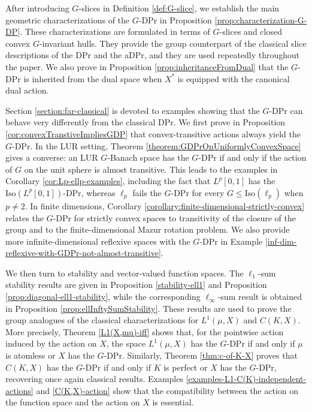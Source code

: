 \documentclass[a4paper,12pt]{amsart}
\theoremstyle{definition}
\theoremstyle{definition}
\theoremstyle{remark}
\numberwithin{equation}{section}
\newcommand{\Iso}{\mathrm{Iso}}
\renewcommand{\leq}{\leqslant}
\newcommand{\<}{\langle}
\renewcommand{\>}{\rangle}
\begin{document}
	After introducing $G$-slices in Definition \ref{def:G-slice}, we establish the main geometric characterizations of the $G$-DPr in Proposition \ref{prop:characterization-G-DP}. These characterizations are formulated in terms of $G$-slices and closed convex $G$-invariant hulls. They provide the group counterpart of the classical slice descriptions of the DPr and the aDPr, and they are used repeatedly throughout the paper. We also prove in Proposition \ref{prop:inheritanceFromDual} that the $G$-DPr is inherited from the dual space when $X^*$ is equipped with the canonical dual action.
	
	Section \ref{section:far-classical} is devoted to examples showing that the $G$-DPr can behave very differently from the classical DPr. We first prove in Proposition \ref{cor:convexTranstiveImpliesGDP} that convex-transitive actions always yield the $G$-DPr. In the LUR setting, Theorem \ref{theorem:GDPrOnUniformlyConvexSpace} gives a converse: an LUR $G$-Banach space has the $G$-DPr if and only if the action of $G$ on the unit sphere is almost transitive. This leads to the examples in Corollary \ref{cor:Lp-ellp-examples}, including the fact that $L^p[0,1]$ has the $\Iso(L^p[0,1])$-DPr, whereas $\ell_p$ fails the $G$-DPr for every $G\leq \Iso(\ell_p)$ when $p\neq2$. In finite dimensions, Corollary \ref{corollary:finite-dimensional-strictly-convex} relates the $G$-DPr for strictly convex spaces to transitivity of the closure of the group and to the finite-dimensional Mazur rotation problem. We also provide more infinite-dimensional reflexive spaces with the $G$-DPr in Example \ref{inf-dim-reflexive-with-GDPr-not-almost-transitive}.
	
	We then turn to stability and vector-valued function spaces. The $\ell_1$-sum stability results are given in Proposition \ref{stability-ell1} and Proposition \ref{prop:diagonal-ell1-stability}, while the corresponding $\ell_\infty$-sum result is obtained in Proposition \ref{prop:ellInftySumStability}. These results are used to prove the group analogues of the classical characterizations for $L^1(\mu,X)$ and $C(K,X)$. More precisely, Theorem \ref{L1(X,mu)-iff} shows that, for the pointwise action induced by the action on $X$, the space $L^1(\mu,X)$ has the $G$-DPr if and only if $\mu$ is atomless or $X$ has the $G$-DPr. Similarly, Theorem \ref{thm:c-of-K-X} proves that $C(K,X)$ has the $G$-DPr if and only if $K$ is perfect or $X$ has the $G$-DPr, recovering once again classical results. Examples \ref{examples-L1-C(K)-independent-actions} and \ref{C(K,X)-action} show that the compatibility between the action on the function space and the action on $X$ is essential.
	
\end{document}
